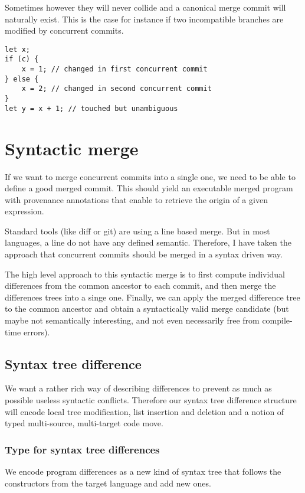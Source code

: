 \documentclass[a4paper,10pt]{article}
\begin{document}
Sometimes however they will never collide and a canonical merge commit will naturally exist. This is the case for instance if two incompatible branches are modified by concurrent commits.
\begin{lstlisting}[caption=Merged version of two compatible concurrent commits modifying $x$]
let x;
if (c) {
    x = 1; // changed in first concurrent commit
} else {
    x = 2; // changed in second concurrent commit
}
let y = x + 1; // touched but unambiguous
\end{lstlisting}

\section{Syntactic merge}
If we want to merge concurrent commits into a single one, we need to be able to define a good merged commit. This should yield an executable merged program with provenance annotations that enable to retrieve the origin of a given expression.

Standard tools (like diff or git) are using a line based merge. But in most languages, a line do not have any defined semantic. Therefore, I have taken the approach that concurrent commits should be merged in a syntax driven way.

The high level approach to this syntactic merge is to first compute individual differences from the common ancestor to each commit, and then merge the differences trees into a singe one. Finally, we can apply the merged difference tree to the common ancestor and obtain a syntactically valid merge candidate (but maybe not semantically interesting, and not even necessarily free from compile-time errors).

\subsection{Syntax tree difference}
We want a rather rich way of describing differences to prevent as much as possible useless syntactic conflicts.
Therefore our syntax tree difference structure will encode local tree modification, list insertion and deletion and a notion of typed multi-source, multi-target code move.

\subsubsection{Type for syntax tree differences}
We encode program differences as a new kind of syntax tree that follows the constructors from the target language and add new ones.
\end{document}
